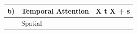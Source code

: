 \begin{tabular}{lll}
\toprule
b) & Temporal Attention & X t X + s \\
\midrule
 & Spatial &  \\
\bottomrule
\end{tabular}
